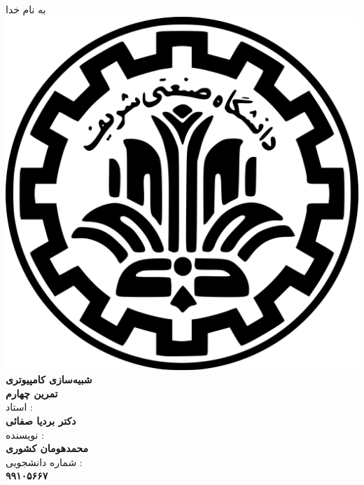 \begin{center}
    به نام خدا
    \\
    \includegraphics[scale=0.02]{commons/sharif.png}
    \\
    \vspace*{5mm}
    \textbf{\Huge{شبیه‌سازی کامپیوتری}}
    \hspace*{1mm}
    \vspace*{5mm}
    \\
    \vspace*{5mm}
    \textbf{تمرین چهارم}
    \\
    \vspace*{7mm}
    استاد :
    \\
    \vspace*{2mm}
    \textbf{\Large{دکتر بردیا صفائی}}
    \\
    \vspace*{7mm}
    نویسنده :
    \\
    \vspace*{2mm}
    \textbf{\Large{محمدهومان کشوری}}
    \\
    \vspace*{7mm}
    شماره دانشجویی :
    \\
    \vspace*{2mm}
    \textbf{\Large{۹۹۱۰۵۶۶۷}}
\end{center}